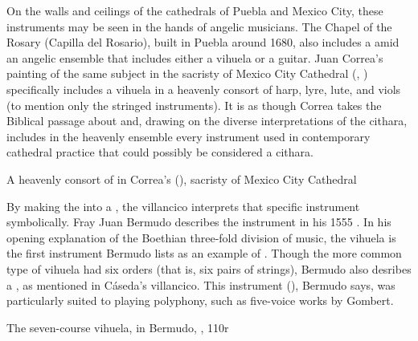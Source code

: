 
On the walls and ceilings of the cathedrals of Puebla and Mexico City, these
instruments may be seen in the hands of angelic musicians.
The Chapel of the Rosary (Capilla del Rosario), built in Puebla around 1680,
also includes a  amid an angelic ensemble
that includes either a vihuela or a guitar.
Juan Correa's painting of the same subject in the sacristy of Mexico City
Cathedral (, ) specifically includes a
vihuela in a heavenly consort of harp, lyre, lute, and viols (to mention only
the stringed instruments).
It is as though Correa takes the Biblical passage about  and, drawing on the diverse interpretations of
the cithara, includes in the heavenly ensemble every instrument used in
contemporary cathedral practice that could possibly be considered a cithara.


{A heavenly consort of  in Correa's  (), sacristy of Mexico City Cathedral}

By making the  into a , the villancico interprets
that specific instrument symbolically.
Fray Juan Bermudo describes the instrument in his 1555 .%
    \Autocite{Bermudo:Declaracion}
In his opening explanation of the Boethian three-fold division of music, the
vihuela is the first instrument Bermudo lists as an example of
 .
Though the more common type of vihuela had six orders (that is, six pairs of
strings), Bermudo also desribes a , as
mentioned in Cáseda's villancico.%
    \Autocite[90v--110r]{Bermudo:Declaracion}
This instrument (), Bermudo says, was particularly
suited to playing polyphony, such as five-voice works by Gombert.


{The seven-course vihuela, in Bermudo, , 110r}

